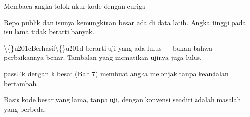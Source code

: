 \documentclass[aspectratio=169,11pt,t]{beamer}
\begin{document}
\begin{frame}[shrink=25]{Membaca angka tolok ukur kode dengan curiga}
\begin{minipage}[t]{0.494\textwidth}
\begin{icardbad}
Repo publik dan isunya kemungkinan besar ada di data latih. Angka tinggi pada isu lama tidak berarti banyak.
\end{icardbad}
\end{minipage}%
\hfill
\begin{minipage}[t]{0.494\textwidth}
\begin{icardbad}
\textbackslash\{\}u201cBerhasil\textbackslash\{\}u201d berarti uji yang ada lulus --- bukan bahwa perbaikannya benar. Tambalan yang mematikan ujinya juga lulus.
\end{icardbad}
\end{minipage}%


\vskip 4pt

\begin{minipage}[t]{0.494\textwidth}
\begin{icardbad}
pass@k dengan k besar (Bab 7) membuat angka melonjak tanpa keandalan bertambah.
\end{icardbad}
\end{minipage}%
\hfill
\begin{minipage}[t]{0.494\textwidth}
\begin{icardbad}
Basis kode besar yang lama, tanpa uji, dengan konvensi sendiri adalah masalah yang berbeda.
\end{icardbad}
\end{minipage}%
\end{frame}
\end{document}
